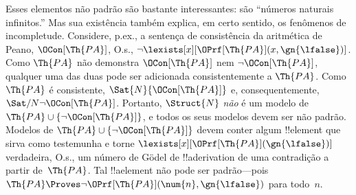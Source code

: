 \documentclass[../../../include/open-logic-section]{subfiles}
\begin{document}
Esses elementos não padrão são bastante interessantes: são ``números
naturais infinitos.'' Mas sua existência também explica, em certo
sentido, os fenômenos de incompletude.  Considere, p.ex., a
sentença de consistência da aritmética de Peano, $\OCon[\Th{PA}]$, O.s.\@, $\lnot \lexists[x][\OPrf[\Th{PA}](x, \gn{\lfalse})]$. Como $\Th{PA}$
não demonstra $\OCon[\Th{PA}]$ nem $\lnot \OCon[\Th{PA}]$, qualquer uma
das duas pode ser adicionada consistentemente a $\Th{PA}$. Como
$\Th{PA}$ é consistente, $\Sat{N}{\OCon[\Th{PA}]}$ e, consequentemente,
$\Sat/{N}{\lnot \OCon[\Th{PA}]}$.  Portanto, $\Struct{N}$ \emph{não} é
um modelo de $\Th{PA} \cup \{\lnot \OCon[\Th{PA}]\}$, e todos os seus
modelos devem ser não padrão. Modelos de $\Th{PA} \cup \{\lnot
\OCon[\Th{PA}]\}$ devem conter algum !!{element} que sirva como
testemunha e torne $\lexists[x][\OPrf[\Th{PA}](\gn{\lfalse})]$
verdadeira, O.s.\@, um número de G\"odel de !!a{derivation} de uma
contradição a partir de~$\Th{PA}$.  Tal !!a{element} não pode ser
padrão---pois $\Th{PA} \Proves \lnot
\OPrf[\Th{PA}](\num{n}, \gn{\lfalse})$ para todo~$n$.
\end{document}
